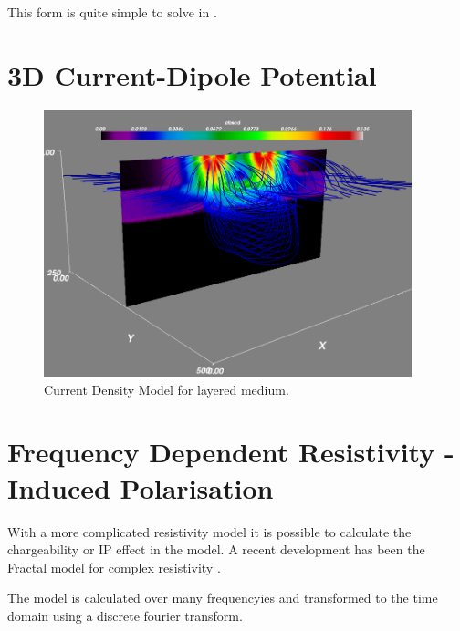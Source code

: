 This form is quite simple to solve in \esc.

\section{3D Current-Dipole Potential}

\begin{figure}[ht]
\centering
\includegraphics[width=0.95\textwidth]{figures/ex11cstreamline.png}
\caption{Current Density Model for layered medium.}
\label{fig:ex11cstream}
\end{figure}

\section{Frequency Dependent Resistivity - Induced Polarisation}
With a more complicated resistivity model it is possible to calculate the
chargeability or IP effect in the model. A recent development has been the
Fractal model for complex resistivity \citep{Farias2010,Honig2007}.


The model is calculated over many frequencyies and transformed to the time
domain using a discrete fourier transform.

